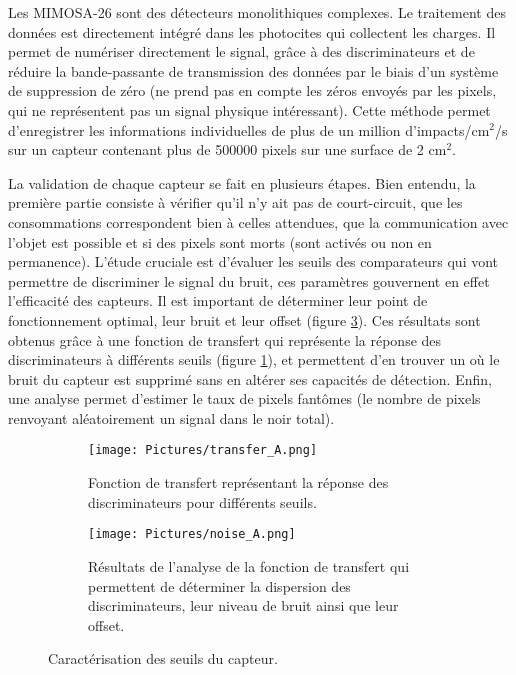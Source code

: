 \documentclass[a4papper, 10pt]{article}
\begin{document}
        Les MIMOSA-26 sont des détecteurs monolithiques complexes. Le traitement des données est directement intégré dans les photocites qui collectent les charges. Il permet de numériser directement le signal, grâce à des discriminateurs et de réduire la bande-passante de transmission des données par le biais d'un système de suppression de zéro (ne prend pas en compte les zéros envoyés par les pixels, qui ne représentent pas un signal physique intéressant).
        Cette méthode permet d'enregistrer les informations individuelles de plus de un million d'impacts/cm$^2$/s sur un capteur contenant plus de 500000 pixels sur une surface de 2 cm$^2$.
        
        La validation de chaque capteur se fait en plusieurs étapes. Bien entendu, la première partie consiste à vérifier qu'il n'y ait pas de court-circuit, que les consommations correspondent bien à celles attendues, que la communication avec l'objet est possible et si des pixels sont morts (sont activés ou non en permanence).
        L'étude cruciale est d'évaluer les seuils des comparateurs qui vont permettre de discriminer le signal du bruit, ces paramètres gouvernent en effet l'efficacité des capteurs. Il est important de déterminer leur point de fonctionnement optimal, leur bruit et leur offset (figure \ref{noise}). Ces résultats sont obtenus grâce à une fonction de transfert qui représente la réponse des discriminateurs à différents seuils (figure \ref{SCurve}), et permettent d'en trouver un où le bruit du capteur est supprimé sans en altérer ses capacités de détection.
        Enfin, une analyse permet d'estimer le taux de pixels fantômes (le nombre de pixels renvoyant aléatoirement un signal dans le noir total). 
        
        
 \begin{figure}
     \centering
     \begin{subfigure}[c]{0.46\linewidth}
        \texttt{[image: Pictures/transfer\_A.png]}
        \caption{Fonction de transfert représentant la réponse des discriminateurs pour différents seuils.}
        \label{SCurve}
     \end{subfigure}
     \quad
     \begin{subfigure}[c]{0.46\linewidth}
        \texttt{[image: Pictures/noise\_A.png]}
        \caption{Résultats de l'analyse de la fonction de transfert qui permettent de déterminer la dispersion des discriminateurs, leur niveau de bruit ainsi que leur offset.}
        \label{noise}
     \end{subfigure}
     \caption{Caractérisation des seuils du capteur.}
 \end{figure}
\end{document}
